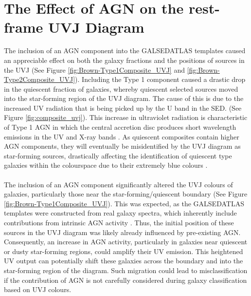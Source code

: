 \section{The Effect of AGN on the rest-frame UVJ Diagram}
The inclusion of an AGN component into the GALSEDATLAS templates caused an appreciable effect on both the galaxy fractions and the positions of sources in the UVJ (See Figure \ref{fig:Brown-Type1Composite_UVJ} and \ref{fig:Brown-Type2Composite_UVJ}). Including the Type 1 component caused a drastic drop in the quiescent fraction of galaxies, whereby quiescent selected sources moved into the star-forming region of the UVJ diagram. The cause of this is due to the increased UV radiation that is being picked up by the U band in the SED. (See Figure \ref{fig:composite_uvj}). This increase in ultraviolet radiation is characteristic of Type 1 AGN in which the central accretion disc produces short wavelength emissions in the UV and X-ray bands \citep{nour_association_2023}. As quiescent composites contain higher AGN components, they will eventually be misidentified by the UVJ diagram as star-forming sources, drastically affecting the identification of quiescent type galaxies within the colourspace due to their extremely blue colours \citep{florez_exploring_2020}.\\\\ The inclusion of an AGN component significantly altered the UVJ colours of galaxies, particularly those near the star-forming/quiescent boundary (See Figure \ref{fig:Brown-Type1Composite_UVJ}).  This was expected, as the GALSEDATLAS templates were constructed from real galaxy spectra, which inherently include contributions from intrinsic AGN activity \citep{brown_atlas_2014}. Thus, the initial position of these sources in the UVJ diagram was likely already influenced by pre-existing AGN.
Consequently, an increase in AGN activity, particularly in galaxies near quiescent or dusty star-forming regions, could amplify their UV emission. This heightened UV output can potentially shift these galaxies across the boundary and into the star-forming region of the diagram. Such migration could lead to misclassification if the contribution of AGN is not carefully considered during galaxy classification based on UVJ colours.\\\\
